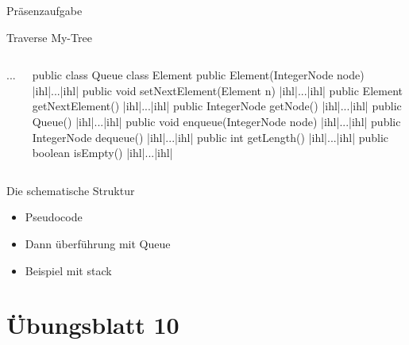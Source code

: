 {\begin{frame}[fragile,c]{Präsenzaufgabe}
\begin{aufgabe}{Traverse My-Tree}
\begin{onlyenv}
\begin{columns}[onlytextwidth,c]
\begin{plainjava}[morekeywords={[3]{BinaryTree, IntegerNode}}]
{  ...
}
\end{plainjava}
\begin{plainjava}[morekeywords={[3]{BinaryTree, IntegerNode}}]
public class Queue {
  class Element {
    public Element(IntegerNode node) { |ihl|...|ihl| }
    public void setNextElement(Element n) { |ihl|...|ihl| }
    public Element getNextElement() { |ihl|...|ihl| }
    public IntegerNode getNode() { |ihl|...|ihl| }
  }
  public Queue() { |ihl|...|ihl| }
  public void enqueue(IntegerNode node) { |ihl|...|ihl| }
  public IntegerNode dequeue() { |ihl|...|ihl| }
  public int getLength() { |ihl|...|ihl| }
  public boolean isEmpty() { |ihl|...|ihl| }
}
\end{plainjava}
    \end{columns}
\end{onlyenv}\vspace*{-1.1\baselineskip}%
\end{aufgabe}
\end{frame}
}

\begin{frame}{Die schematische Struktur}
    \begin{itemize}
        \item Pseudocode
        \item Dann überführung mit Queue
        \item Beispiel mit stack
    \end{itemize}
\end{frame}

\section{Übungsblatt 10}
